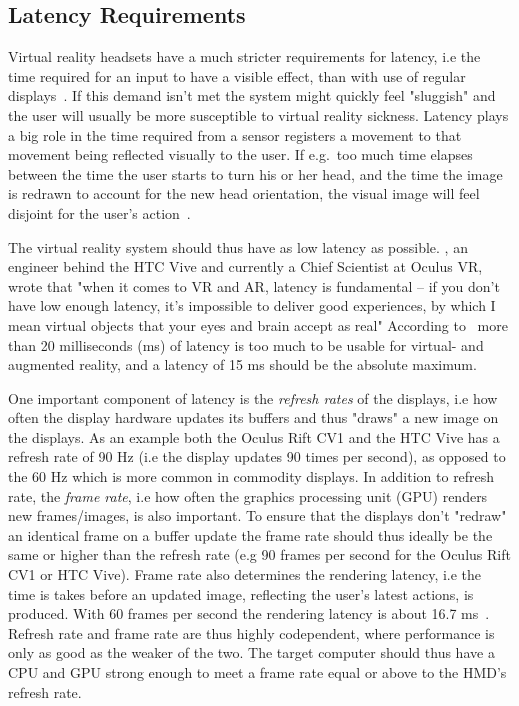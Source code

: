 \subsection{Latency Requirements}
Virtual reality headsets have a much stricter requirements for latency, i.e the time required for an input to have a visible effect, 
than with use of regular displays~\citep{ROADTOVR2013}. If this demand isn't met the system might quickly feel "sluggish" and the user will usually be more susceptible to
virtual reality sickness. Latency plays a big role in the time required from a sensor registers a movement to that movement being reflected visually to the user.
If e.g.~too much time elapses between the time the user starts to turn his or her head, and the time 
the image is redrawn to account for the new head orientation, the visual image will feel disjoint for the user's action~\citep{Abrash2012}.

The virtual reality system should thus have as low latency as possible. 
\citet{Abrash2012}, an engineer behind the HTC Vive and currently a Chief Scientist at Oculus VR, wrote that "when it comes to VR and AR, latency is fundamental – 
if you don’t have low enough latency, it’s impossible to deliver good experiences, by which I mean virtual objects that your eyes and brain accept as real"
According to~\citet{Abrash2012} more than 20 milliseconds (ms) of latency is too much to be usable for virtual- and augmented reality, 
and a latency of 15 ms should be the absolute maximum.

One important component of latency is the \textit{refresh rates} of the displays, i.e 
how often the display hardware updates its buffers and thus "draws" a new image on the displays. As an example both the Oculus Rift CV1 and the HTC Vive
has a refresh rate of 90 Hz (i.e the display updates 90 times per second), as opposed to the 60 Hz which is more common in commodity displays.
In addition to refresh rate, the \textit{frame rate}, i.e how often the graphics processing unit (GPU) renders new frames/images, is also important. To ensure 
that the displays don't "redraw" an identical frame on a buffer update the frame rate should thus ideally be the same or higher than the refresh 
rate (e.g 90 frames per second for the Oculus Rift CV1 or HTC Vive). Frame rate also determines the rendering latency, i.e the time is takes before 
an updated image, reflecting the user's latest actions, is produced. With 60 frames per second the rendering latency is about 16.7 ms~\citep{Abrash2012}. 
Refresh rate and frame rate are thus highly codependent, where performance is only as good as the weaker of the two. 
The target computer should thus have a CPU and GPU strong enough to meet a frame rate equal or above to the HMD's refresh rate. 

